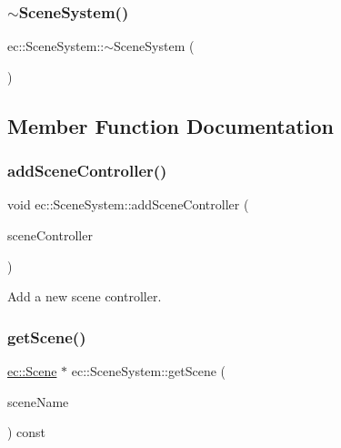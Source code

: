 \subsubsection{\texorpdfstring{$\sim$\+Scene\+System()}{~SceneSystem()}}
{\footnotesize\ttfamily ec\+::\+Scene\+System\+::$\sim$\+Scene\+System (\begin{DoxyParamCaption}{ }\end{DoxyParamCaption})\hspace{0.3cm}{\ttfamily [default]}}



\subsection{Member Function Documentation}
\mbox{\label{classec_1_1_scene_system_a6f59921ccb0a64ead95efc6ef34ffac1}} 
\subsubsection{\texorpdfstring{add\+Scene\+Controller()}{addSceneController()}}
{\footnotesize\ttfamily void ec\+::\+Scene\+System\+::add\+Scene\+Controller (\begin{DoxyParamCaption}\item[{std\+::unique\+\_\+ptr$<$ \mbox{\hyperlink{classec_1_1_scene_controller}{Scene\+Controller}} $>$}]{scene\+Controller }\end{DoxyParamCaption})}



Add a new scene controller. 

\mbox{\label{classec_1_1_scene_system_a25b2df199ddab1abc0e2e3f2c87bb690}} 
\subsubsection{\texorpdfstring{get\+Scene()}{getScene()}}
{\footnotesize\ttfamily \mbox{\hyperlink{classec_1_1_scene}{ec\+::\+Scene}} $\ast$ ec\+::\+Scene\+System\+::get\+Scene (\begin{DoxyParamCaption}\item[{const std\+::string \&}]{scene\+Name }\end{DoxyParamCaption}) const}



